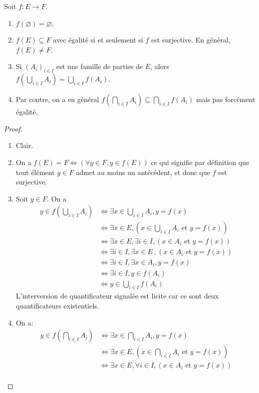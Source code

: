 \begin{proposition}
Soit $f : E\to F$.
\begin{enumerate}
\item $f(\varnothing)=\varnothing$.
\item $f(E)\subseteq F$ avec égalité si et seulement si $f$ est surjective. En général, $f(E)\neq F$.
\item Si $(A_i)_{i\in I}$ est une famille de parties de $E$, alors $f\left(\bigcup_{i\in I}A_i\right) = \bigcup_{i\in I} f(A_i)$.
\item Par contre, on a en général $f\left(\bigcap_{i\in I}A_i\right) \subseteq \bigcap_{i\in I} f\left(A_i\right)$ mais pas forcément égalité.
\end{enumerate}
\end{proposition}
\begin{proof}
\begin{enumerate}
\item Clair.
\item On a $f(E)=F \iff (\forall y\in F, y\in f(E))$ ce qui signifie par définition que tout élément $y\in F$ admet au moins un antécédent, et donc que $f$ est surjective.  
\item Soit $y\in F$. On a 
\begin{align*}
y\in f\left( \bigcup_{i\in I} A_i \right)
&\iff \exists x\in  \bigcup_{i\in I} A_i,   y=f(x) \\
&\iff \exists x\in E, \left( x\in \bigcup_{i\in I} A_i\text{ et }  y=f(x)\right)\\
&\iff \exists x\in E, \exists i\in I,  (x\in A_i\text{ et } y=f(x)) \\
&\boxed{\iff \exists i\in I, \exists x\in E}\:, (x\in A_i\text{ et } y=f(x))\\
&\iff \exists i\in I, \exists x\in A_i, y=f(x)\\
&\iff \exists i\in I, y\in f(A_i)\\
&\iff y\in \bigcup_{i\in I} f(A_i)
\end{align*}
L'interversion de quantificateur signalée est licite car ce sont deux quantificateurs existentiels.
\item On a:
\begin{align*}
y\in f\left( \bigcap_{i\in I} A_i \right)
&\iff \exists x\in  \bigcap_{i\in I} A_i,   y=f(x) \\
&\iff \exists x\in E, \left( x\in \bigcap_{i\in I} A_i\text{ et }  y=f(x)\right)\\
&\iff \exists x\in E, \forall i\in I,  (x\in A_i\text{ et } y=f(x)) \\

\end{align*}
\end{enumerate}
\end{proof}
